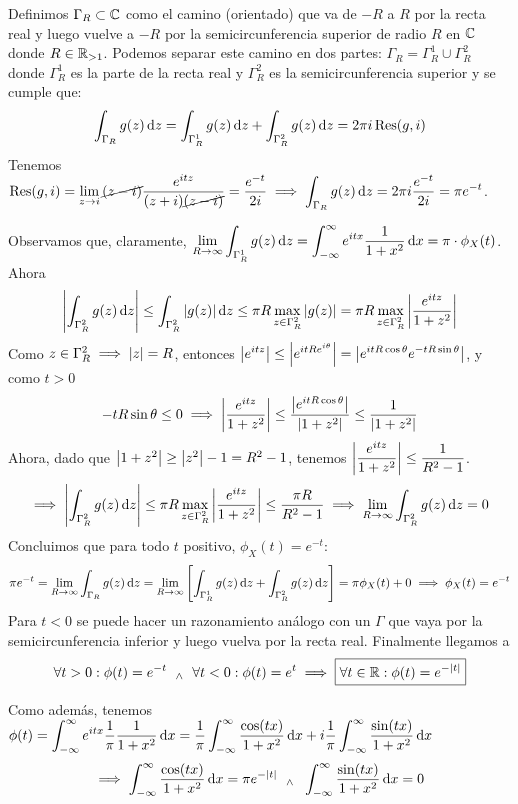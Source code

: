 Definimos $\Gamma_R \subset \mathbb{C}$ como el camino (orientado) que va de $-R$ a $R$ por la recta real y luego vuelve a $-R$ por la semicircunferencia superior de radio $R$ en $\mathbb{C}$ donde $R\in \mathbb{R}_{>1}$. Podemos separar este camino en dos partes: $\Gamma_R = \Gamma_R^1 \cup \Gamma_R^2$ donde $\Gamma_R^1$ es la parte de la recta real y $\Gamma_R^2$ es la semicircunferencia superior y se cumple que:
\[\int_{\Gamma_R} g(z)\odif{z} = \int_{\Gamma_R^1} g(z)\odif{z} + \int_{\Gamma_R^2} g(z)\odif{z} = 2\pi i \operatorname{Res}(g, i)\]
Tenemos $\ds \operatorname{Res}(g, i) = \lim_{z\to i} \cancel{(z-i)}\frac{e^{itz}}{(z+i)\cancel{(z-i)}} = \frac{e^{-t}}{2i} \implies \int_{\Gamma_R} g(z)\odif{z} = 2\pi i \frac{e^{-t}}{2i} = \pi e^{-t}$.

Observamos que, claramente, $\ds \lim_{R\to\infty} \int_{\Gamma_R^1} g(z)\odif{z} = \int_{-\infty}^{\infty} e^{itx} \frac{1}{1+x^2}\odif{x} = \pi \cdot \phi_X(t)$. Ahora
\[\abs{\int_{\Gamma_R^2} g(z)\odif{z}} \leq \int_{\Gamma_R^2} \abs{g(z)}\odif{z} \leq \pi R \max_{z\in \Gamma_R^2} \abs{g(z)} = \pi R \max_{z\in \Gamma_R^2} \abs{\frac{e^{itz}}{1+z^2}}\]
Como $z \in \Gamma_R^2 \implies \left|z\right| = R$, entonces $\displaystyle \left|e^{itz}\right| \leq \left|e^{it R e^{i\theta}}\right| = \left|e^{itR\cos{\theta}} e^{-tR\sin{\theta}}\right|$, y como $t>0$
\[-tR\sin{\theta} \leq 0 \implies \left|\frac{e^{itz}}{1+z^2}\right| \leq \frac{\left|e^{itR\cos{\theta}}\right|}{\left|1+z^2\right|} \leq \frac{1}{\left|1+z^2\right|} \]
Ahora, dado que $\left|1+z^2\right| \geq \left|z^2\right| - 1 = R^2 - 1$, tenemos $\displaystyle \left|\frac{e^{itz}}{1+z^2}\right| \leq \frac{1}{R^2 - 1}$.
\[\implies \abs{\int_{\Gamma_R^2} g(z)\odif{z}} \leq \pi R \max_{z\in \Gamma_R^2} \abs{\frac{e^{itz}}{1+z^2}} \leq \frac{\pi R}{R^2 - 1} \implies \lim_{R\to\infty} \int_{\Gamma_R^2} g(z)\odif{z} = 0\]
Concluimos que para todo $t$ positivo, $\phi_X(t) = e^{-t}$:
\[ \pi e^{-t} = \lim_{R\to \infty} \int_{\Gamma_R} g(z)\odif{z} = \lim_{R\to\infty} \left[\int_{\Gamma_R^1} g(z)\odif{z} + \int_{\Gamma_R^2} g(z)\odif{z}\right] = \pi \phi_X(t) + 0 \implies \phi_X(t) = e^{-t}\]
Para $t<0$ se puede hacer un razonamiento análogo con un $\Gamma$ que vaya por la semicircunferencia inferior y luego vuelva por la recta real. Finalmente llegamos a
\[\forall t > 0 : \phi(t) = e^{-t} \, \, \; _{\wedge} \; \, \, \forall t < 0 : \phi(t) = e^t \implies \boxed{\forall t \in \mathbb{R} : \phi(t) = e^{-\left|t\right|}}\]

Como además, tenemos $\ds \phi(t) = \int_{-\infty}^{\infty} e^{itx} \frac{1}{\pi} \frac{1}{1+x^2}\odif{x} = \frac{1}{\pi}\int_{-\infty}^{\infty} \frac{\cos(tx)}{1+x^2}\odif{x} + i\frac{1}{\pi}\int_{-\infty}^{\infty} \frac{\sin(tx)}{1+x^2}\odif{x}$
\[\implies \int_{-\infty}^{\infty} \frac{\cos(tx)}{1+x^2}\odif{x} = \pi e^{-\abs{t}} \,\, \we \,\, \int_{-\infty}^{\infty} \frac{\sin(tx)}{1+x^2}\odif{x} = 0\]